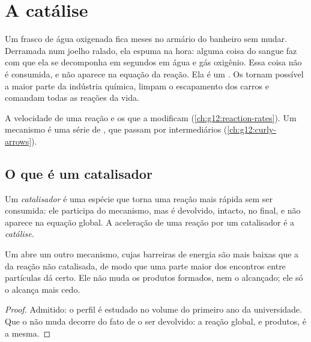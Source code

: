 \chapter{A catálise}\label{ch:g12:catalysis}

Um frasco de água oxigenada fica meses no armário do banheiro sem mudar.
Derramada num joelho ralado, ela espuma na hora: alguma coisa do sangue
faz com que ela se decomponha em segundos em água e gás oxigênio. Essa
coisa não é consumida, e não aparece na equação da reação. Ela é um
. Os  tornam possível a maior parte da indústria
química, limpam o escapamento dos carros e comandam todas as reações da
vida.

\begin{recall}
A velocidade de uma reação e os  que a modificam
(\cref{ch:g12:reaction-rates}). Um mecanismo é uma série de , que passam por intermediários (\cref{ch:g12:curly-arrows}).
\end{recall}

\section{O que é um catalisador}

\begin{definition}\label{def:g12:catalysis:catalyst}
Um \emph{catalisador} é uma espécie que torna uma
reação mais rápida sem ser consumida: ele participa do mecanismo, mas é
devolvido, intacto, no final, e não aparece na equação global. A
aceleração de uma reação por um catalisador é a
\emph{catálise}.
\end{definition}

\begin{proposition}\label{prop:g12:catalysis:path}
Um  abre um outro mecanismo, cujas barreiras de energia são
mais baixas que a da reação não catalisada, de modo que uma parte maior
dos encontros entre partículas dá certo. Ele não muda os produtos
formados, nem o  alcançado; ele só o alcança mais cedo.
\end{proposition}

\begin{proof}
Admitido: o perfil é estudado no volume do primeiro ano da universidade.
Que o  não muda decorre do fato de o  ser
devolvido: a reação global,  e produtos, é a mesma.
\end{proof}

